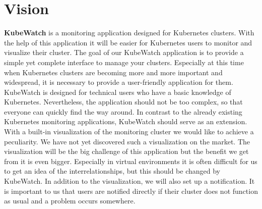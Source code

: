 \chapter{Vision}


\textbf{KubeWatch} is a monitoring application designed for Kubernetes clusters. With the help of this application it will be easier for Kubernetes users to monitor and visualize their cluster. The goal of our KubeWatch application is to provide a simple yet complete interface to manage your clusters. Especially at this time when Kubernetes clusters are becoming more and more important and widespread, it is necessary to provide a user-friendly application for them. KubeWatch is designed for technical users who have a basic knowledge of Kubernetes. Nevertheless, the application should not be too complex, so that everyone can quickly find the way around. 
In contrast to the already existing Kubernetes monitoring applications, KubeWatch should serve as an extension. With a built-in visualization of the monitoring cluster we would like to achieve a peculiarity. We have not yet discovered such a visualization on the market. The visualization will be the big challenge of this application but the benefit we get from it is even bigger. Especially in virtual environments it is often difficult for us to get an idea of the interrelationships, but this should be changed by KubeWatch. In addition to the visualization, we will also set up a notification. It is important to us that users are notified directly if their cluster does not function as usual and a problem occurs somewhere.